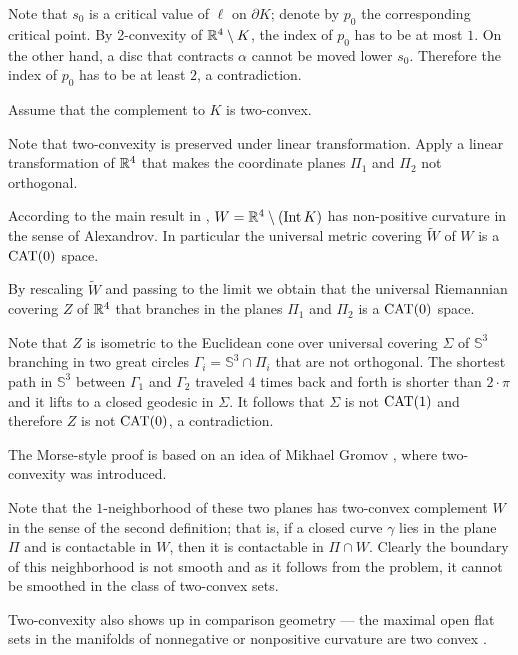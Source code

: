 Note that $s_0$ is a critical value of $\ell$ on $\partial K$;
denote by $p_0$ the corresponding critical point.
By 2-convexity of $\mathbb{R}^4\setminus K$,
the index of $p_0$ has to be at most $1$.
On the other hand, a disc that contracts $\alpha$ cannot be moved lower $s_0$.
Therefore the index of $p_0$ has to be at least $2$, a contradiction.
\qeds

Assume that the complement to $K$ is two-convex.

Note that two-convexity is preserved under linear transformation.
Apply a linear transformation of $\mathbb{R}^4$ that makes the coordinate planes $\Pi_1$ and $\Pi_2$ not orthogonal.

According to the main result in \cite{ABB}, $W\z=\RR^4\setminus (\Int K)$ has non-positive curvature in the sense of Alexandrov.
In particular the universal metric covering $\tilde W$ of $W$ is a $\operatorname{\rm CAT}\nolimits(0)$ space.

By rescaling $\tilde W$ and passing to the limit we obtain that the universal Riemannian covering $Z$ of $\mathbb{R}^4$ that branches in the planes $\Pi_1$ and $\Pi_2$ is a $\operatorname{\rm CAT}\nolimits(0)$ space.

Note that $Z$ is isometric to the Euclidean cone over universal covering $\Sigma$ of $\mathbb{S}^3$ branching in two great circles $\Gamma_i=\mathbb{S}^3\cap \Pi_i$ that are not orthogonal.
The shortest path in $\mathbb{S}^3$ between $\Gamma_1$ and $\Gamma_2$ traveled 4 times back and forth is shorter than $2\cdot\pi$ and it lifts to a closed geodesic in $\Sigma$.
It follows that $\Sigma$ is not $\operatorname{\rm CAT}\nolimits(1)$ and therefore $Z$ is not $\operatorname{\rm CAT}\nolimits(0)$, a contradiction.\qeds

The Morse-style proof is based on an idea of Mikhael Gromov \cite[see \S\textonehalf{} in][]{gromov-SGMC}, where two-convexity was introduced.

Note that the $1$-neighborhood of these two planes has two-convex complement $W$ in the sense of the second definition;
that is, if a closed curve $\gamma$ lies in the plane $\Pi$
and is contactable in $W$, then it is contactable in $\Pi\cap W$.
Clearly the boundary of this neighborhood is not smooth
and as it follows from the problem, it cannot be smoothed in the class of two-convex sets. 

Two-convexity also shows up in comparison geometry --- the maximal open flat sets in the manifolds of nonnegative or nonpositive curvature are two convex \cite{panov-petrunin}.


